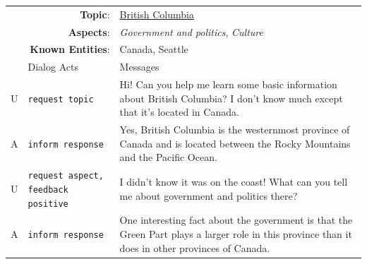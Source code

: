 \begin{table}[t]
    \small
    \begin{center}
        \setlength\tabcolsep{3.5pt}
        \begin{tabular}{p{0.2cm}p{3.8cm}p{11cm}}
            \toprule[\heavyrulewidth]
              & \multicolumn{1}{r}{\textbf{Topic}:}          & \underline{British Columbia}                                                                                                                                                                         \\
              & \multicolumn{1}{r}{\textbf{Aspects}:}        & \textit{Government and politics}, \textit{Culture}                                                                                                                                                   \\
              & \multicolumn{1}{r}{\textbf{Known Entities}:} & Canada, Seattle                                                                                                                                                                                      \\
            \midrule
              & Dialog Acts                                  & Messages                                                                                                                                                                                             \\
            \midrule
            U & \texttt{request topic}                       & Hi! Can you help me learn some basic information about British Columbia? I don't know much except that it's located in Canada.                                                                       \\
            A & \texttt{inform response}                     & Yes, British Columbia is the westernmost province of Canada and is located between the Rocky Mountains and the Pacific Ocean.                                                                        \\
            U & \texttt{request aspect, feedback positive}   & I didn't know it was on the coast! What can you tell me about government and politics there?                                                                                                         \\
            A & \texttt{inform response}                     & One interesting fact about the government is that the Green Part plays a larger role in this province than it does in other provinces of Canada.                                                     \\

\end{tabular}
\end{center}
\end{table}
